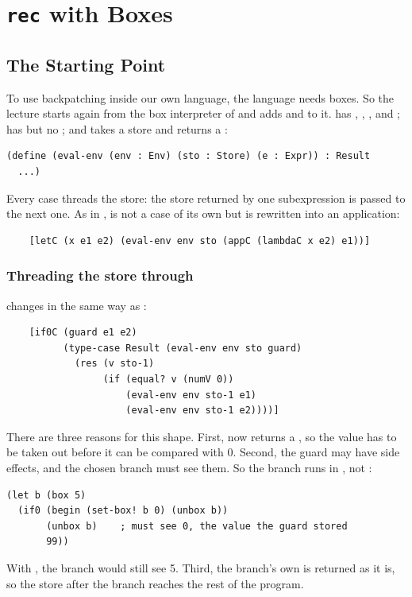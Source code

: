 \section{\texttt{rec} with Boxes}
\label{sec:recboxes}

\subsection{The Starting Point}

To use backpatching inside our own language, the language needs boxes. So the lecture starts again from the box interpreter of  and adds  and  to it.  has , , , and ;  has  but no ; and  takes a store and returns a :
\begin{lstlisting}
(define (eval-env (env : Env) (sto : Store) (e : Expr)) : Result
  ...)
\end{lstlisting}
Every case threads the store: the store returned by one subexpression is passed to the next one. As in ,  is not a case of its own but is rewritten into an application:
\begin{lstlisting}
    [letC (x e1 e2) (eval-env env sto (appC (lambdaC x e2) e1))]
\end{lstlisting}

\subsubsection{Threading the store through }  changes in the same way as :
\begin{lstlisting}
    [if0C (guard e1 e2)
          (type-case Result (eval-env env sto guard)
            (res (v sto-1)
                 (if (equal? v (numV 0))
                     (eval-env env sto-1 e1)
                     (eval-env env sto-1 e2))))]
\end{lstlisting}
There are three reasons for this shape. First,  now returns a , so the value  has to be taken out before it can be compared with 0. Second, the guard may have side effects, and the chosen branch must see them. So the branch runs in , not :
\begin{lstlisting}
(let b (box 5)
  (if0 (begin (set-box! b 0) (unbox b))
       (unbox b)    ; must see 0, the value the guard stored
       99))
\end{lstlisting}
With , the branch would still see 5. Third, the branch's own  is returned as it is, so the store after the branch reaches the rest of the program.

